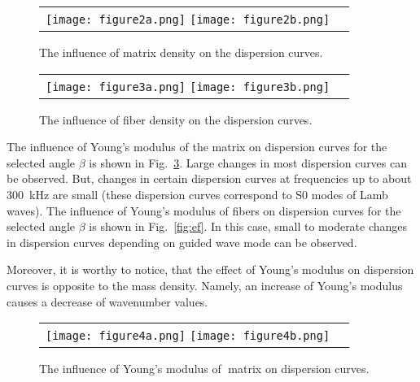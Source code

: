\documentclass[]{spie}  %
\newcommand{\myfigscale}{0.9}
\begin{document}
\begin{figure} [ht]
	\begin{center}
		\begin{tabular}{cc} %
			\texttt{[image: figure2a.png]}
			\texttt{[image: figure2b.png]}
		\end{tabular}
	\end{center}
	\caption[] 
	{ \label{fig:rhom} 
		The influence of matrix density on the dispersion curves.}
\end{figure} 

\begin{figure} [ht]
	\begin{center}
		\begin{tabular}{cc} %
			\texttt{[image: figure3a.png]}
			\texttt{[image: figure3b.png]}
		\end{tabular}
	\end{center}
	\caption[] 
	{ \label{fig:rhof} 
		The influence of fiber density on the dispersion curves.}
\end{figure} 
The influence of Young's modulus of the matrix on dispersion curves for the selected angle 
\(\beta\) is shown in Fig.~\ref{fig:em}. 
Large changes in most dispersion curves can be observed. 
But, changes in certain dispersion curves at frequencies up to about 300~kHz are small (these dispersion curves correspond to S0 modes of Lamb waves).
The influence of Young's modulus of fibers on dispersion curves for the selected angle 
\(\beta\) is shown in Fig.~\ref{fig:ef}. 
In this case, small to moderate changes in dispersion curves depending on guided wave mode can be observed. 

Moreover, it is worthy to notice, that the effect of Young's modulus on dispersion curves is opposite to the mass density. 
Namely, an increase of  Young's modulus causes a decrease of wavenumber values.
\begin{figure} [ht]
	\begin{center}
		\begin{tabular}{cc} %
			\texttt{[image: figure4a.png]}
			\texttt{[image: figure4b.png]}
		\end{tabular}
	\end{center}
	\caption[] 
	{ \label{fig:em} 
		The influence of Young's modulus of matrix on dispersion curves.}
\end{figure} 
\end{document}
